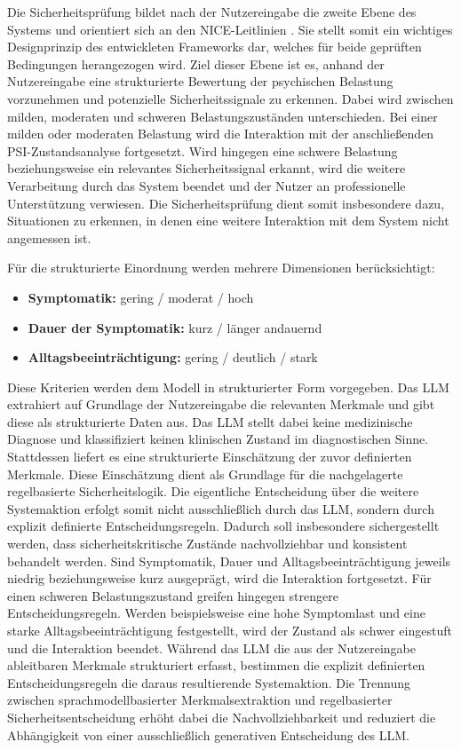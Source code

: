 Die Sicherheitsprüfung bildet nach der Nutzereingabe die zweite Ebene des Systems und orientiert sich an den NICE-Leitlinien \citep{kendrick2012common}. Sie stellt somit ein wichtiges Designprinzip des entwickleten Frameworks dar, welches für beide geprüften Bedingungen herangezogen wird. Ziel dieser Ebene ist es, anhand der Nutzereingabe eine strukturierte Bewertung der psychischen Belastung vorzunehmen und potenzielle Sicherheitssignale zu erkennen. Dabei wird zwischen milden, moderaten und schweren Belastungszuständen unterschieden.
Bei einer milden oder moderaten Belastung wird die Interaktion mit der anschließenden PSI-Zustandsanalyse fortgesetzt. Wird hingegen eine schwere Belastung beziehungsweise ein relevantes Sicherheitssignal erkannt, wird die weitere Verarbeitung durch das System beendet und der Nutzer an professionelle Unterstützung verwiesen. Die Sicherheitsprüfung dient somit insbesondere dazu, Situationen zu erkennen, in denen eine weitere Interaktion mit dem System nicht angemessen ist.

Für die strukturierte Einordnung werden mehrere Dimensionen berücksichtigt:

\begin{itemize}
    \item \textbf{Symptomatik:} gering / moderat / hoch
    \item \textbf{Dauer der Symptomatik:} kurz / länger andauernd
    \item \textbf{Alltagsbeeinträchtigung:} gering / deutlich / stark
\end{itemize}

Diese Kriterien werden dem Modell in strukturierter Form vorgegeben. Das LLM extrahiert auf Grundlage der Nutzereingabe die relevanten Merkmale und gibt diese als strukturierte Daten aus.
Das LLM stellt dabei keine medizinische Diagnose und klassifiziert keinen klinischen Zustand im diagnostischen Sinne. Stattdessen liefert es eine strukturierte Einschätzung der zuvor definierten Merkmale. Diese Einschätzung dient als Grundlage für die nachgelagerte regelbasierte Sicherheitslogik. Die eigentliche Entscheidung über die weitere Systemaktion erfolgt somit nicht ausschließlich durch das LLM, sondern durch explizit definierte Entscheidungsregeln. Dadurch soll insbesondere sichergestellt werden, dass sicherheitskritische Zustände nachvollziehbar und konsistent behandelt werden. Sind Symptomatik, Dauer und Alltagsbeeinträchtigung jeweils niedrig beziehungsweise kurz ausgeprägt, wird die Interaktion fortgesetzt.
Für einen schweren Belastungszustand greifen hingegen strengere Entscheidungsregeln. Werden beispielsweise eine hohe Symptomlast und eine starke Alltagsbeeinträchtigung festgestellt, wird der Zustand als schwer eingestuft und die Interaktion beendet.
Während das LLM die aus der Nutzereingabe ableitbaren Merkmale strukturiert erfasst, bestimmen die explizit definierten Entscheidungsregeln die daraus resultierende Systemaktion. Die Trennung zwischen sprachmodellbasierter Merkmalsextraktion und regelbasierter Sicherheitsentscheidung erhöht dabei die Nachvollziehbarkeit und reduziert die Abhängigkeit von einer ausschließlich generativen Entscheidung des LLM.


